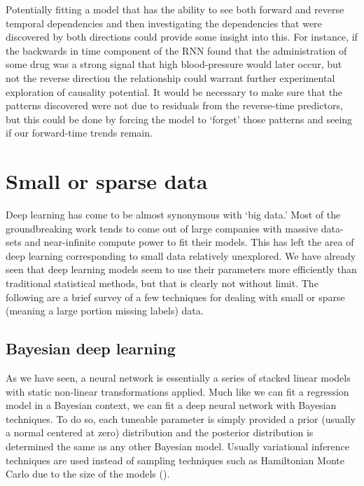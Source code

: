 \documentclass[]{book}
\theoremstyle{definition}
\theoremstyle{definition}
\theoremstyle{definition}
\theoremstyle{remark}
\begin{document}
Potentially fitting a model that has the ability to see both forward and
reverse temporal dependencies and then investigating the dependencies
that were discovered by both directions could provide some insight into
this. For instance, if the backwards in time component of the RNN found
that the administration of some drug was a strong signal that high
blood-pressure would later occur, but not the reverse direction the
relationship could warrant further experimental exploration of causality
potential. It would be necessary to make sure that the patterns
discovered were not due to residuals from the reverse-time predictors,
but this could be done by forcing the model to `forget' those patterns
and seeing if our forward-time trends remain.

\section{Small or sparse data}\label{small-or-sparse-data}

Deep learning has come to be almost synonymous with `big data.' Most of
the groundbreaking work tends to come out of large companies with
massive data-sets and near-infinite compute power to fit their models.
This has left the area of deep learning corresponding to small data
relatively unexplored. We have already seen that deep learning models
seem to use their parameters more efficiently than traditional
statistical methods, but that is clearly not without limit. The
following are a brief survey of a few techniques for dealing with small
or sparse (meaning a large portion missing labels) data.

\subsection{Bayesian deep learning}\label{bayesian-deep-learning}

As we have seen, a neural network is essentially a series of stacked
linear models with static non-linear transformations applied. Much like
we can fit a regression model in a Bayesian context, we can fit a deep
neural network with Bayesian techniques. To do so, each tuneable
parameter is simply provided a prior (usually a normal centered at zero)
distribution and the posterior distribution is determined the same as
any other Bayesian model. Usually variational inference techniques are
used instead of sampling techniques such as Hamiltonian Monte Carlo due
to the size of the models (\citet{bayesnets}).
\end{document}
